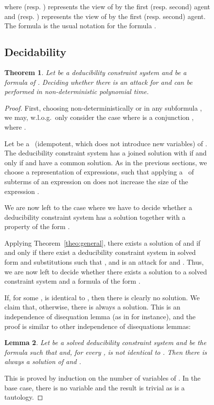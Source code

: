 \documentclass[acmtocl,acmnow]{acmtrans2m}
\newtheorem{theorem}{Theorem}[section]
\newtheorem{lemma}[theorem]{Lemma}
\newcommand{\dedsys}[1]{deducibility constraint system}
\begin{document}
\begin{figure}[t]
{{where  (resp. ) represents the view of  by the first
(resp. second) agent and
 (resp. ) represents the view of  by the first
(resp. second) agent. The formula  is the usual
notation for the formula .


\subsection{Decidability}




\begin{theorem}
Let  be a \dedsys{} and  be a formula of .
Deciding whether there is an attack for  and  can be performed in
non-deterministic polynomial time.
\end{theorem}
\begin{proof}



First, choosing non-deterministically  or  in any
subformula , we may, w.l.o.g.~only consider the
case where  is a conjunction ,
where . 






Let  be a ~(idempotent, which does not introduce new variables)
of .  
The \dedsys{}  has a joined solution with  if and only if
 and  have a common solution. As in the previous sections,
we choose a representation of expressions, such that applying a ~of
subterms of an expression  on  does not increase the size of the expression . 

We are now left to the case where we have to decide whether a
\dedsys{} has a solution together with a property of the form
.



Applying Theorem~\ref{theo:general},  there exists
a solution  of  and  
if and only if there exist a \dedsys{}  in solved form
  and  substitutions  such that ,  and  is an attack for  
and . 
Thus, we are now left to decide whether there exists a solution to
a solved constraint system  and a formula  of the form
.







If, for some ,  is identical to , then there is clearly no
solution. We claim that, otherwise, there is always a solution. This
is an independence of disequation lemma (as in \cite{colmerauer84} for instance),
and the proof is similar to other independence of disequations lemmas:


\begin{lemma}
Let  be a solved \dedsys{} and  be the formula 
such that  and, for every ,  is not identical to . Then  there is always a solution
 of  and .
\end{lemma}
This is proved by induction on the number of variables of .
In the base case, there is no variable and the result is trivial as  is
a tautology.


\end{proof}}}
\end{figure}
\end{document}
